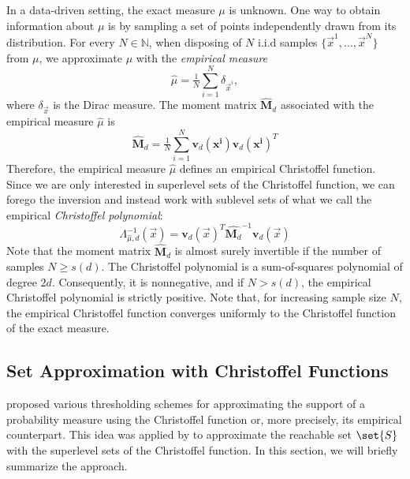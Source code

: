 \documentclass[pmlr]{jmlr}%
\begin{document}
In a data-driven setting, the exact measure $\mu$ is unknown. One way to obtain information about $\mu$ is by sampling a set of points independently drawn from its distribution. For every $N \in \mathbb{N}$, when disposing of $N$ i.i.d samples $\{ \Vec{x}^{1}, \ldots, \Vec{x}^{N} \}$ from $\mu$, we approximate $\mu$ with the \emph{empirical measure} %
\[  \hat{\mu} = \tfrac{1}{N}{\sum}_{i=1}^N \delta_{\Vec{x}^i},\]
where $\delta_{\Vec{x}}$ is the Dirac measure.
%
The moment matrix $\widehat{\mathbf{M}}_d$ associated with the empirical measure $\hat{\mu}$ is 
\begin{equation}\label{eq:moment matrix}
\widehat{\mathbf{M}}_d = \tfrac{1}{N} {\sum}_{i=1}^{N}\mathbf{v}_{d}(\mathbf{x^{i}}) \mathbf{v}_{d}(\mathbf{x^{i}})^{T} 
\end{equation}
Therefore, the empirical measure $\hat{\mu} $ defines an empirical Christoffel function. Since we are only interested in superlevel sets of the Christoffel function, we can forego the inversion and instead work with sublevel sets of what we call the empirical \emph{Christoffel polynomial}: \begin{equation}\label{eq:empiricalChristoffel}
 \Lambda^{-1}_{\hat{\mu}, d}(\Vec{x}) = \mathbf{v}_{d}(\Vec{x})^{T} \widehat{\mathbf{M}_{d}}^{-1} \mathbf{v}_{d}(\Vec{x})
\end{equation}
%
Note that the moment matrix $\widehat{\mathbf{M}}_d$ is almost surely invertible if the number of samples $N \geq s(d)$.
The Christoffel polynomial is a sum-of-squares polynomial of degree $2d$. Consequently, it is nonnegative, and if $N > s(d)$, the empirical Christoffel polynomial is strictly positive.
%
Note that, for increasing sample size $N$, the empirical Christoffel function converges uniformly to the Christoffel function of the exact measure.

\subsection{Set Approximation with Christoffel Functions}
\label{ssec:Set Approximation with Christoffel Functions}
%
\cite{lasserre2019empirical} proposed various thresholding schemes for approximating the support of a probability measure using the Christoffel function or, more precisely, its empirical counterpart. This idea was applied by \cite{devonport} to approximate the reachable set $\set{S}$ with the superlevel sets of the Christoffel function. In this section, we will briefly summarize the approach. 
\end{document}
